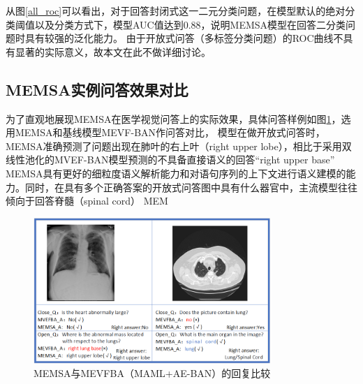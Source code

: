 
从图\ref{all_roc}可以看出，对于回答封闭式这一二元分类问题，在模型默认的绝对分类阈值以及分类方式下，模型AUC值达到0.88，说明MEMSA模型在回答二分类问题时具有较强的泛化能力。
由于开放式问答（多标签分类问题）的ROC曲线不具有显著的实际意义，故本文在此不做详细讨论。

\subsection{MEMSA实例问答效果对比}
为了直观地展现MEMSA在医学视觉问答上的实际效果，具体问答样例如图\ref{fig:qa_demo}，选用MEMSA和基线模型MEVF-BAN作问答对比，
模型在做开放式问答时，MEMSA准确预测了问题出现在肺叶的右上叶（right upper lobe），相比于采用双线性池化的MVEF-BAN模型预测的不具备直接语义的回答“right upper base”
MEMSA具有更好的细粒度语义解析能力和对语句序列的上下文进行语义建模的能力。同时，在具有多个正确答案的开放式问答图中具有什么器官中，主流模型往往倾向于回答脊髓（spinal cord）
MEM
\begin{figure}[htbp]
	\centering	
	\includegraphics[width=0.8\textwidth]{Fig/myfig/chapter3/qa_demo.png}  %
	\caption{\label{fig:qa_demo}MEMSA与MEVFBA（MAML+AE-BAN）的回复比较} 
\end{figure}


